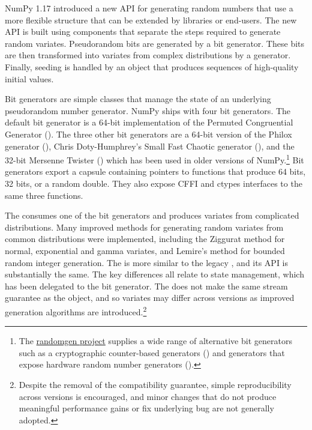 
NumPy 1.17 introduced a new API for generating random numbers that use a more
flexible structure that can be extended by libraries or end-users. The new API
is built using components that separate the steps required to generate random
variates. Pseudorandom bits are generated by a bit generator. These bits are
then transformed into variates from complex distributions by a generator.
Finally, seeding is handled by an object that produces sequences of high-quality
initial values.

Bit generators are simple classes that manage the state of an underlying
pseudorandom number generator. NumPy ships with four bit generators. The default
bit generator is a 64-bit implementation of the Permuted Congruential Generator
\cite{pcg64} (). The three other bit generators are a 64-bit version
of the Philox generator\cite{random123} (), Chris Doty-Humphrey's
Small Fast Chaotic generator\cite{practrand} (), and the 32-bit
Mersenne Twister\cite{mt19937} () which has been used in older
versions of NumPy.\footnote{The
\href{https://github.com/bashtage/randomgen}{randomgen project} supplies a wide
range of alternative bit generators such as a cryptographic counter-based
generators () and generators that expose hardware random number
generators ()\cite{randomgen}.} Bit generators export a capsule
containing pointers to functions that produce 64 bits, 32 bits, or a random
double. They also expose CFFI and ctypes interfaces to the same three functions.

The  consumes one of the bit generators and produces variates
from complicated distributions. Many improved methods for generating random
variates from common distributions were implemented, including the Ziggurat
method for normal, exponential and gamma variates\cite{ziggurat}, and Lemire's
method for bounded random integer generation\cite{lemire}. The 
is more similar to the legacy , and its API is substantially
the same. The key differences all relate to state management, which has been
delegated to the bit generator. The  does not make the same
stream guarantee as the  object, and so variates may differ
across versions as improved generation algorithms are
introduced.\footnote{Despite the removal of the compatibility guarantee, simple
reproducibility across versions is encouraged, and minor changes that do not
produce meaningful performance gains or fix underlying bug are not generally
adopted.}


